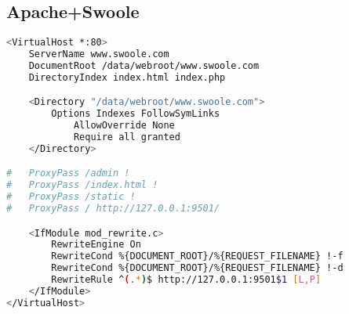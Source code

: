 \subsection{Apache+Swoole}



\begin{lstlisting}[language=bash]
<VirtualHost *:80>
    ServerName www.swoole.com
    DocumentRoot /data/webroot/www.swoole.com
    DirectoryIndex index.html index.php

    <Directory "/data/webroot/www.swoole.com">
        Options Indexes FollowSymLinks
            AllowOverride None
            Require all granted
    </Directory>

#   ProxyPass /admin !
#   ProxyPass /index.html !
#   ProxyPass /static !
#   ProxyPass / http://127.0.0.1:9501/

    <IfModule mod_rewrite.c>
        RewriteEngine On
        RewriteCond %{DOCUMENT_ROOT}/%{REQUEST_FILENAME} !-f
        RewriteCond %{DOCUMENT_ROOT}/%{REQUEST_FILENAME} !-d
        RewriteRule ^(.*)$ http://127.0.0.1:9501$1 [L,P]
    </IfModule>
</VirtualHost>
\end{lstlisting}










\begin{lstlisting}[language=bash]

\end{lstlisting}






\begin{lstlisting}[language=bash]

\end{lstlisting}






\begin{lstlisting}[language=bash]

\end{lstlisting}





\begin{lstlisting}[language=bash]

\end{lstlisting}





